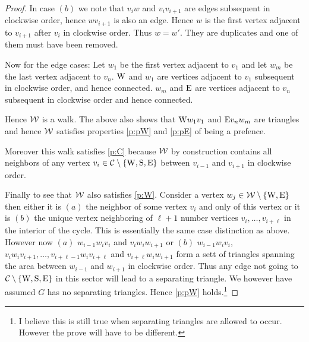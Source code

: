 \begin{proof}
In case $(b)$ we note that $v_i w$ and $v_i v_{i+1}$ are edges subsequent in clockwise order, hence $wv_{i+1}$ is also an edge. Hence $w$ is the first vertex adjacent to $v_{i+1}$ after $v_i$ in clockwise order. Thus $w= w'$. They are duplicates and one of them must have been removed.

Now for the edge cases: Let $w_1$ be the first vertex adjacent to $v_1$ and let $w_m$ be the last vertex adjacent to $v_n$. $\mathrm{W}$ and $w_1$ are vertices adjacent to $v_1$ subsequent in clockwise order, and hence connected. $w_m$ and $\mathrm{E}$ are vertices adjacent to $v_n$ subsequent in clockwise order and hence connected.

Hence $\mathcal{W}$ is a walk. The above also shows that $\mathrm{W} w_1 v_1$ and $\mathrm{E} v_n w_m$ are triangles and hence $\mathcal{W}$ satisfies properties \ref{p:pW} and \ref{p:pE} of being a prefence.

Moreover this walk satisfies  \ref{p:C} because $\mathcal{W}$ by construction contains all neighbors of any vertex $v_i \in \mathcal{C} \setminus \left\lbrace {\mathrm{W}, \mathrm{S}, \mathrm{E}} \right\rbrace$ between $v_{i-1}$ and $v_{i+1}$ in clockwise order.

Finally to see that $\mathcal{W}$ also satisfies \ref{p:W}. Consider a vertex $w_j \in \mathcal{W} \setminus \left\lbrace {\mathrm{W}, \mathrm{E}} \right\rbrace$ then either it is $(a)$ the neighbor of some vertex $v_i$ and only of this vertex or it is $(b)$ the unique vertex neighboring of $\ell +1$ number vertices $v_i, \ldots, v_{i+\ell}$ in the interior of the cycle. This is essentially the same case distinction as above. However now $(a)$ $w_{i-1} w_i v_i$ and $v_i w_i w_{i+1}$ or $(b)$ $w_{i-1} w_i v_i$, $v_i w_i v_{i+1}, \ldots, v_{i+\ell -1} w_i v_{i+\ell} $ and $v_{i+\ell} w_i w_{i+1}$ form a sett of triangles spanning the area between $w_{i-1}$ and $w_{i+1}$ in clockwise order. Thus any edge not going to $\mathcal{C} \setminus \left\lbrace {\mathrm{W}, \mathrm{S}, \mathrm{E}} \right\rbrace$ in this sector will lead to a separating triangle. We however have assumed $G$ has no separating triangles. Hence \ref{p:pW} holds.\footnote{I believe this is still true when separating triangles are allowed to occur. However the prove will have to be different.}
\end{proof}






